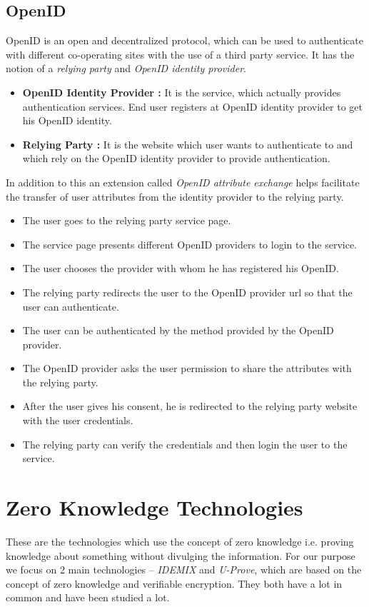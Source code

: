 \subsection{OpenID}
OpenID is an open and decentralized protocol, which can be used to authenticate with different co-operating sites with the use of a third party service. It has the notion of a \textit{relying party} and \textit{OpenID identity provider}.
\begin{itemize}
\item \textbf{OpenID Identity Provider :} It is the service, which actually provides authentication services. End user registers at OpenID identity provider to get his OpenID identity.
\item \textbf{Relying Party :} It is the website which user wants to authenticate to and which rely on the OpenID identity provider to provide authentication.
\end{itemize}
In addition to this an extension called \textit{OpenID attribute exchange}\cite{hardt2007openid} helps facilitate the transfer of user attributes from the identity provider to the relying party.
\begin{itemize}
\item The user goes to the relying party service page.
\item The service page presents different OpenID providers to login to the service.
\item The user chooses the provider with whom he has registered his OpenID.
\item The relying party redirects the user to the OpenID provider url so that the user can authenticate.
\item The user can be authenticated by the method provided by the OpenID provider.
\item The OpenID provider asks the user permission to share the attributes with the relying party.
\item After the user gives his consent, he is redirected to the relying party website with the user credentials.
\item The relying party can verify the credentials and then login the user to the service.
\end{itemize}
\section{Zero Knowledge Technologies}
These are the technologies which use the concept of zero knowledge\cite{ZK} i.e. proving knowledge about something without divulging the information. For our purpose we focus on 2 main technologies – \textit{IDEMIX}\cite{1_zurich_ibm_com_2015} and \textit{U-Prove}\cite{3_research_microsoft_com_2015}, which are based on the concept of zero knowledge\cite{ZK} and verifiable encryption\cite{VE}. They both have a lot in common and have been studied a lot. 
